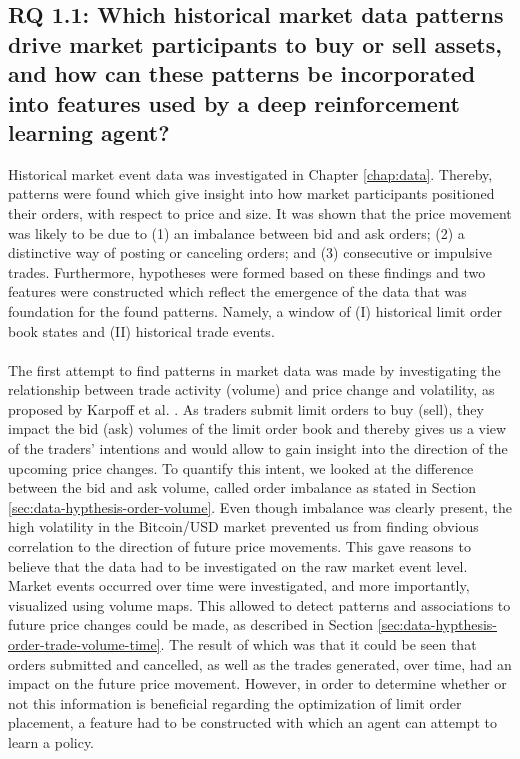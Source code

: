\subsection{RQ 1.1: Which historical market data patterns drive market participants to buy or sell assets, and how can these patterns be incorporated into features used by a deep reinforcement learning agent?}

    Historical market event data was investigated in Chapter \ref{chap:data}. 
    Thereby, patterns were found which give insight into how market participants positioned their orders, with respect to price and size. 
    It was shown that the price movement was likely to be due to (1) an imbalance between bid and ask orders; (2) a distinctive way of posting or canceling orders; and (3) consecutive or impulsive trades.
    Furthermore, hypotheses were formed based on these findings and two features were constructed which reflect the emergence of the data that was foundation for the found patterns.
    Namely, a window of (I) historical limit order book states and (II) historical trade events.
    \\
    \\
The first attempt to find patterns in market data was made by investigating the relationship between trade activity (volume) and price change and volatility, as proposed by Karpoff et al. \cite{karpoff1987relation}.  
As traders submit limit orders to buy (sell), they impact the bid (ask) volumes of the  limit order book and thereby gives us a view of the traders’ intentions and would allow  to gain insight into the direction of the upcoming price changes.
To quantify this intent, we looked at the difference between the bid and ask volume, called order imbalance as stated in Section \ref{sec:data-hypthesis-order-volume}.
Even though imbalance was clearly present, the high volatility in the Bitcoin/USD market prevented us from finding obvious correlation to the direction of future price movements.
This gave reasons to believe that the data had to be investigated on the raw market event level\cite{kane2011analyzing}.
Market events occurred over time were investigated, and more importantly, visualized using volume maps.
This allowed to detect patterns and associations to future price changes could be made, as described in Section \ref{sec:data-hypthesis-order-trade-volume-time}.
The result of which was that it could be seen that orders submitted and cancelled, as well as the trades generated, over time, had an impact on the future price movement.
However, in order to determine whether or not this information is beneficial regarding the optimization of limit order placement, a feature had to be constructed with which an agent can attempt to learn a policy.
